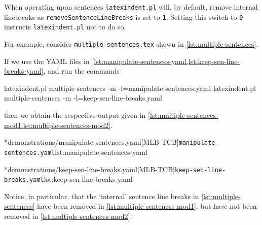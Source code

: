 	When operating upon sentences \texttt{latexindent.pl} will, by default, remove
	internal linebreaks as \texttt{removeSentenceLineBreaks} is set to \texttt{1}.
	Setting this switch to \texttt{0} instructs \texttt{latexindent.pl}
	not to do so.

	For example, consider \texttt{multiple-sentences.tex} shown in \cref{lst:multiple-sentences}.


	If we use the YAML files in \cref{lst:manipulate-sentences-yaml,lst:keep-sen-line-breaks-yaml}, and run the commands
	\begin{widepage}
		\begin{commandshell}
latexindent.pl multiple-sentences -m -l=manipulate-sentences.yaml
latexindent.pl multiple-sentences -m -l=keep-sen-line-breaks.yaml
	\end{commandshell}
	\end{widepage}
	then we obtain the respective output given in \cref{lst:multiple-sentences-mod1,lst:multiple-sentences-mod2}.

        \begin{cmhtcbraster}
		\cmhlistingsfromfile[style=yaml-LST]*{demonstrations/manipulate-sentences.yaml}[MLB-TCB]{\texttt{manipulate-sentences.yaml}}{lst:manipulate-sentences-yaml}
        \end{cmhtcbraster}

        \begin{cmhtcbraster}
		\cmhlistingsfromfile[style=yaml-LST]*{demonstrations/keep-sen-line-breaks.yaml}[MLB-TCB]{\texttt{keep-sen-line-breaks.yaml}}{lst:keep-sen-line-breaks-yaml}
        \end{cmhtcbraster}

	Notice, in particular, that the `internal' sentence line breaks in
	\cref{lst:multiple-sentences} have been removed in \cref{lst:multiple-sentences-mod1}, but have
	not been removed in \cref{lst:multiple-sentences-mod2}.

